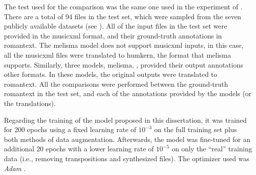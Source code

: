 
The test used for the comparison was the same one used in
the experiment of .
There are a total of 94 files in the test set, which were
sampled from the seven publicly available datasets (see
). All of the input files
in the test set were provided in the \gls{musicxml} format,
and their ground-truth annotations in \gls{romantext}. The
\gls{melisma} model does not support \gls{musicxml} inputs,
in this case, all the \gls{musicxml} files were translated
to \gls{humkern}, the format that \gls{melisma} supports.
Similarly, three models, \gls{melisma},
\textcite{chen2021attend, mcleod2021modular}, provided their
output annotations other formats. In these models, the
original outputs were translated to \gls{romantext}. All the
comparisons were performed between the ground-truth
\gls{romantext} in the test set, and each of the annotations
provided by the models (or the translations). 

Regarding the training of the model proposed in this
dissertation, it was trained for 200 epochs using a fixed
learning rate of $10^{-3}$ on the full training set plus
both methods of data augmentation. Afterwards, the model was
fine-tuned for an additional 20 epochs with a lower learning
rate of $10^{-5}$ on only the ``real'' training data (i.e.,
removing transpositions and synthesized files). The
optimizer used was \emph{Adam} \textcite{kingma2014adam}.

